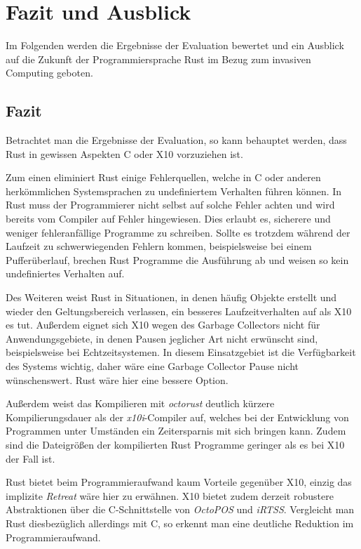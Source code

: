 \chapter{Fazit und Ausblick}\label{sec:conclusion}

Im Folgenden werden die Ergebnisse der Evaluation bewertet
und ein Ausblick auf die Zukunft der Programmiersprache Rust im Bezug zum invasiven Computing geboten.

\section{Fazit}

Betrachtet man die Ergebnisse der Evaluation, so kann behauptet werden,
dass Rust in gewissen Aspekten C oder X10 vorzuziehen ist.

Zum einen eliminiert Rust einige Fehlerquellen, welche in C oder anderen herkömmlichen
Systemsprachen zu undefiniertem Verhalten führen können.
In Rust muss der Programmierer nicht selbst auf solche Fehler achten und wird bereits vom Compiler auf Fehler
hingewiesen. Dies erlaubt es, sicherere und weniger fehleranfällige Programme zu schreiben.
Sollte es trotzdem während der Laufzeit zu schwerwiegenden Fehlern kommen, beispielsweise bei einem Pufferüberlauf,
brechen Rust Programme die Ausführung ab und weisen so kein undefiniertes Verhalten auf.

Des Weiteren weist Rust in Situationen, in denen häufig Objekte erstellt und wieder den Geltungsbereich verlassen,
ein besseres Laufzeitverhalten auf als X10 es tut. Außerdem eignet sich X10 wegen des Garbage Collectors nicht für 
Anwendungsgebiete, in denen Pausen jeglicher Art nicht erwünscht sind, beispielsweise bei Echtzeitsystemen. In diesem
Einsatzgebiet ist die Verfügbarkeit des Systems wichtig, daher wäre eine Garbage Collector Pause nicht
wünschenswert. Rust wäre hier eine bessere Option.

Außerdem weist das Kompilieren mit \textit{octorust} deutlich kürzere Kompilierungsdauer
als der \textit{x10i}-Compiler auf,
welches bei der Entwicklung von Programmen unter Umständen ein Zeitersparnis
mit sich bringen kann. 
Zudem sind die Dateigrößen der kompilierten Rust Programme geringer als es bei X10 der Fall ist.

Rust bietet beim Programmieraufwand kaum Vorteile gegenüber X10, einzig das implizite \textit{Retreat} wäre hier zu 
erwähnen.
X10 bietet zudem derzeit robustere Abstraktionen über die C-Schnittstelle von \textit{OctoPOS} und
\textit{iRTSS}.
Vergleicht man Rust diesbezüglich allerdings mit C, so erkennt man eine deutliche Reduktion im Programmieraufwand.

